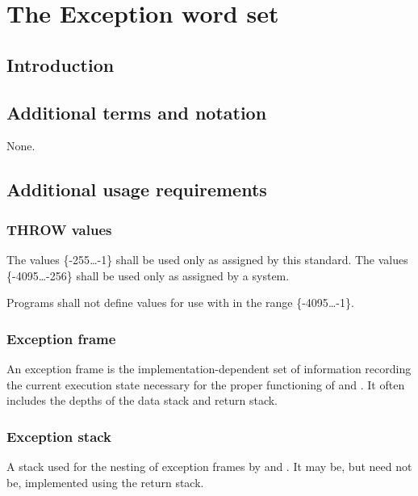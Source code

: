 
\chapter{The Exception word set} %


\section{Introduction} %

\section{Additional terms and notation} %
None.

\section{Additional usage requirements} %

\subsection{THROW values} %
\label{exception:throw}

The  values \{-255{\ldots}-1\} shall be used only as
assigned by this standard. The values \{-4095{\ldots}-256\}
shall be used only as assigned by a system.

Programs shall not define values for use with  in the
range \{-4095{\ldots}-1\}.

\subsection{Exception frame} %

An exception frame is the implementation-dependent set of
information recording the current execution state necessary for
the proper functioning of  and . It often
includes the depths of the data stack and return stack.

\subsection{Exception stack} %

A stack used for the nesting of exception frames by 
and . It may be, but need not be, implemented using
the return stack.


